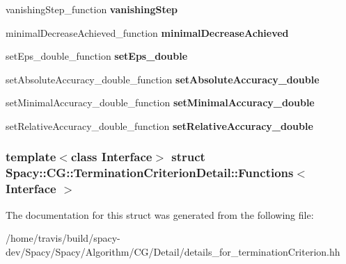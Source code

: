 \begin{DoxyCompactItemize}
\item 
\hypertarget{structSpacy_1_1CG_1_1TerminationCriterionDetail_1_1Functions_aa3b71677b6cd5b6731a654616aa65f59}{vanishing\-Step\-\_\-function {\bfseries vanishing\-Step}}\label{structSpacy_1_1CG_1_1TerminationCriterionDetail_1_1Functions_aa3b71677b6cd5b6731a654616aa65f59}

\item 
\hypertarget{structSpacy_1_1CG_1_1TerminationCriterionDetail_1_1Functions_adab4f28e38fb4f414a77588f02d74d5c}{minimal\-Decrease\-Achieved\-\_\-function {\bfseries minimal\-Decrease\-Achieved}}\label{structSpacy_1_1CG_1_1TerminationCriterionDetail_1_1Functions_adab4f28e38fb4f414a77588f02d74d5c}

\item 
\hypertarget{structSpacy_1_1CG_1_1TerminationCriterionDetail_1_1Functions_acb0a8f3f5a06867939498fe7328ffd0d}{set\-Eps\-\_\-double\-\_\-function {\bfseries set\-Eps\-\_\-double}}\label{structSpacy_1_1CG_1_1TerminationCriterionDetail_1_1Functions_acb0a8f3f5a06867939498fe7328ffd0d}

\item 
\hypertarget{structSpacy_1_1CG_1_1TerminationCriterionDetail_1_1Functions_a37fc5ba815b5732740f2c8019dcb710f}{set\-Absolute\-Accuracy\-\_\-double\-\_\-function {\bfseries set\-Absolute\-Accuracy\-\_\-double}}\label{structSpacy_1_1CG_1_1TerminationCriterionDetail_1_1Functions_a37fc5ba815b5732740f2c8019dcb710f}

\item 
\hypertarget{structSpacy_1_1CG_1_1TerminationCriterionDetail_1_1Functions_a01f5d4c90a6e6cebe756f1bd2fd728d2}{set\-Minimal\-Accuracy\-\_\-double\-\_\-function {\bfseries set\-Minimal\-Accuracy\-\_\-double}}\label{structSpacy_1_1CG_1_1TerminationCriterionDetail_1_1Functions_a01f5d4c90a6e6cebe756f1bd2fd728d2}

\item 
\hypertarget{structSpacy_1_1CG_1_1TerminationCriterionDetail_1_1Functions_aaca742da5b34f5eb38d07948a94b8f5a}{set\-Relative\-Accuracy\-\_\-double\-\_\-function {\bfseries set\-Relative\-Accuracy\-\_\-double}}\label{structSpacy_1_1CG_1_1TerminationCriterionDetail_1_1Functions_aaca742da5b34f5eb38d07948a94b8f5a}

\end{DoxyCompactItemize}
\subsubsection*{template$<$class \-Interface$>$ struct Spacy\-::\-C\-G\-::\-Termination\-Criterion\-Detail\-::\-Functions$<$ Interface $>$}



\-The documentation for this struct was generated from the following file\-:\begin{DoxyCompactItemize}
\item 
/home/travis/build/spacy-\/dev/\-Spacy/\-Spacy/\-Algorithm/\-C\-G/\-Detail/details\-\_\-for\-\_\-termination\-Criterion.\-hh\end{DoxyCompactItemize}
